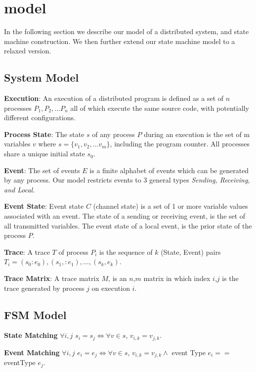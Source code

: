 \section{model}

In the following section we describe our model of a distributed system, and
state machine construction. We then further extend our state machine model to a
relaxed version.


\subsection{System Model}

\noindent\textbf{Execution}: An execution of a distributed program is defined as a set
of $n$ processes $P_1, P_2, \dots P_n$ all of which execute the same source
code, with potentially different configurations.

\noindent\textbf{Process State}: The state $s$ of any process $P$ during an
execution is the set of m variables $v$ where $s = \{ v_1, v_2, \dots v_m \}$,
including the program counter.  All processes share a unique initial state
$s_0$.

\noindent\textbf{Event}: The set of events $E$ is a finite alphabet of events which can
be generated by any process. Our model restricts events to 3 general types
\textit{Sending, Receiving, and Local}.

\noindent\textbf{Event State}: Event state $C$ (channel state) is a set of 1 or more
variable values associated with an event. The state of a sending or receiving
event, is the set of all transmitted variables. The event state of a local
event, is the prior state of the process $P$.

\noindent\textbf{Trace}: A trace $T$ of process $P_i$ is the sequence of $k$ (State,
Event) pairs $T_i = {(s_0:e_0),(s_1,:e_1), \dots ,(s_k,e_k)}$.

\noindent\textbf{Trace Matrix}: A trace matrix $M$, is an $n$,$m$ matrix in which index
$i$,$j$ is the trace generated by process $j$ on execution $i$.

\subsection{FSM Model}

\noindent\textbf{State Matching} $\forall i,j$ $s_i = s_j \iff \forall v \in s$, $v_{i,k} = v_{j,k}$.

\noindent\textbf{Event Matching} $\forall i,j$ $e_i = e_j \iff \forall v \in s$, $v_{i,k} = v_{j,k} \wedge$ event Type $e_i == $ eventType $e_j$.

